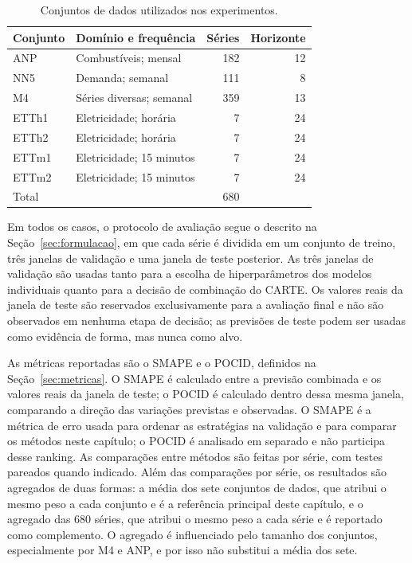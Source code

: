 \begin{table}[H]
\small
\centering
\caption{Conjuntos de dados utilizados nos experimentos.}
\label{tab:resultados-datasets}
\begin{tabular}{@{}l l r r@{}}
\toprule
\textbf{Conjunto} & \textbf{Domínio e frequência} & \textbf{Séries} & \textbf{Horizonte} \\
\midrule
ANP  & Combustíveis; mensal & 182 & 12 \\
NN5  & Demanda; semanal & 111 & 8 \\
M4   & Séries diversas; semanal & 359 & 13 \\
ETTh1 & Eletricidade; horária & 7 & 24 \\
ETTh2 & Eletricidade; horária & 7 & 24 \\
ETTm1 & Eletricidade; 15 minutos & 7 & 24 \\
ETTm2 & Eletricidade; 15 minutos & 7 & 24 \\
\midrule
Total & & 680 & \\
\bottomrule
\end{tabular}
\end{table}

Em todos os casos, o protocolo de avaliação segue o descrito na Seção~\ref{sec:formulacao}, em que cada série é dividida em um conjunto de treino, três janelas de validação e uma janela de teste posterior. As três janelas de validação são usadas tanto para a escolha de hiperparâmetros dos modelos individuais quanto para a decisão de combinação do CARTE. Os valores reais da janela de teste são reservados exclusivamente para a avaliação final e não são observados em nenhuma etapa de decisão; as previsões de teste podem ser usadas como evidência de forma, mas nunca como alvo.

As métricas reportadas são o SMAPE e o POCID, definidos na Seção~\ref{sec:metricas}. O SMAPE é calculado entre a previsão combinada e os valores reais da janela de teste; o POCID é calculado dentro dessa mesma janela, comparando a direção das variações previstas e observadas. O SMAPE é a métrica de erro usada para ordenar as estratégias na validação e para comparar os métodos neste capítulo; o POCID é analisado em separado e não participa desse ranking. As comparações entre métodos são feitas por série, com testes pareados quando indicado. Além das comparações por série, os resultados são agregados de duas formas: a média dos sete conjuntos de dados, que atribui o mesmo peso a cada conjunto e é a referência principal deste capítulo, e o agregado das 680 séries, que atribui o mesmo peso a cada série e é reportado como complemento. O agregado é influenciado pelo tamanho dos conjuntos, especialmente por M4 e ANP, e por isso não substitui a média dos sete.

